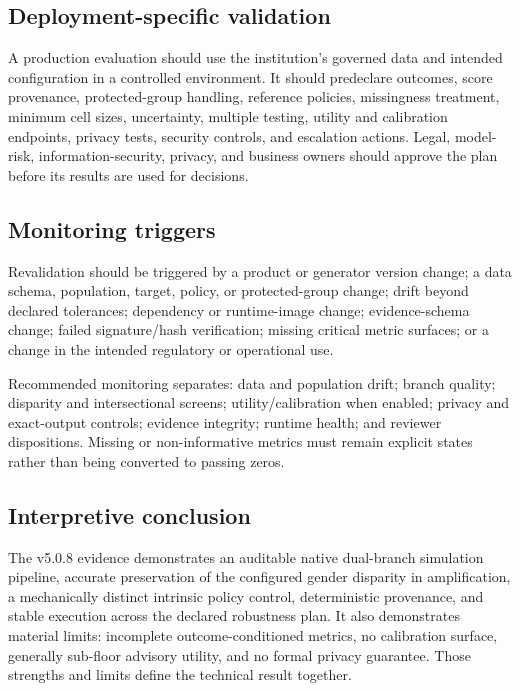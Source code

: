 \subsection{Deployment-specific validation}

A production evaluation should use the institution's governed data and intended configuration in a
controlled environment. It should predeclare outcomes, score provenance, protected-group handling,
reference policies, missingness treatment, minimum cell sizes, uncertainty, multiple testing,
utility and calibration endpoints, privacy tests, security controls, and escalation actions. Legal,
model-risk, information-security, privacy, and business owners should approve the plan before its
results are used for decisions.

\subsection{Monitoring triggers}

Revalidation should be triggered by a product or generator version change; a data schema,
population, target, policy, or protected-group change; drift beyond declared tolerances; dependency
or runtime-image change; evidence-schema change; failed signature/hash verification; missing
critical metric surfaces; or a change in the intended regulatory or operational use.

Recommended monitoring separates: data and population drift; branch quality; disparity and
intersectional screens; utility/calibration when enabled; privacy and exact-output controls;
evidence integrity; runtime health; and reviewer dispositions. Missing or non-informative metrics
must remain explicit states rather than being converted to passing zeros.

\subsection{Interpretive conclusion}

The v5.0.8 evidence demonstrates an auditable native dual-branch simulation pipeline, accurate
preservation of the configured gender disparity in amplification, a mechanically distinct intrinsic
policy control, deterministic provenance, and stable execution across the declared robustness plan.
It also demonstrates material limits: incomplete outcome-conditioned metrics, no calibration
surface, generally sub-floor advisory utility, and no formal privacy guarantee. Those strengths and
limits define the technical result together.
